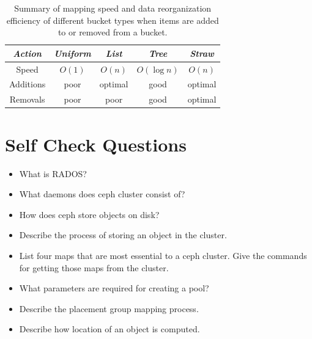 \documentclass[12pt,a4paper]{report}
\begin{document}
\begin{table}[h!]
\centering
\begin{tabular}{ |c|c|c|c|c| }
	\hline
	\emph{Action} & \emph{Uniform} & \emph{List} & \emph{Tree} & \emph{Straw} \\
	\hline
	Speed & $O(1)$ & $O(n)$ & $O(\log{n})$ & $O(n)$ \\
	\hline
	Additions & poor & optimal & good & optimal \\
	Removals  & poor & poor & good & optimal \\
	\hline
\end{tabular}
\caption{Summary of mapping speed and data reorganization efficiency of different bucket types when items are added to or removed from a bucket.}
\label{table:2}
\end{table}

\section{Self Check Questions}

\begin{itemize}
	\item What is RADOS?

	\item What daemons does ceph cluster consist of?

	\item How does ceph store objects on disk?

	\item Describe the process of storing an object in the cluster.

	\item List four maps that are most essential to a ceph cluster. Give
		the commands for getting those maps from the cluster.

	\item What parameters are required for creating a pool?

	\item Describe the placement group mapping process.

	\item Describe how location of an object is computed.
\end{itemize}
\end{document}
